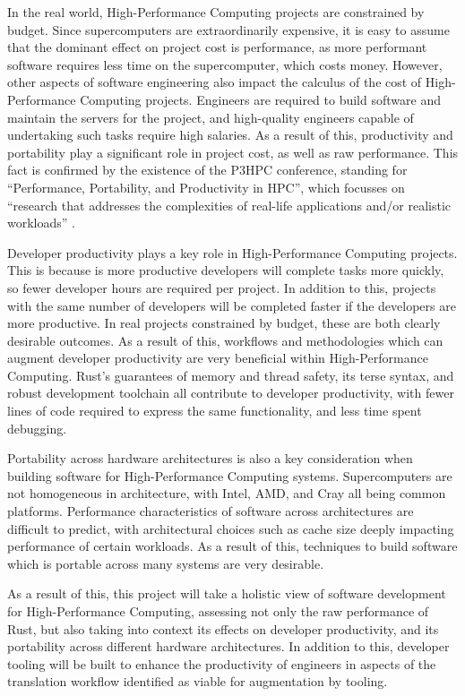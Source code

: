 In the real world, High-Performance Computing projects are constrained by budget. Since supercomputers are extraordinarily expensive, it is easy to assume that the dominant effect on project cost is performance, as more performant software requires less time on the supercomputer, which costs money. However, other aspects of software engineering also impact the calculus of the cost of High-Performance Computing projects. Engineers are required to build software and maintain the servers for the project, and high-quality engineers capable of undertaking such tasks require high salaries. As a result of this, productivity and portability play a significant role in project cost, as well as raw performance. This fact is confirmed by the existence of the P3HPC conference, standing for ``Performance, Portability, and Productivity in HPC'', which focusses on ``research that addresses the complexities of real-life applications and/or realistic workloads'' \cite{P3HPC}.

Developer productivity plays a key role in High-Performance Computing projects. This is because is more productive developers will complete tasks more quickly, so fewer developer hours are required per project. In addition to this, projects with the same number of developers will be completed faster if the developers are more productive. In real projects constrained by budget, these are both clearly desirable outcomes. As a result of this, workflows and methodologies which can augment developer productivity are very beneficial within High-Performance Computing. Rust's guarantees of memory and thread safety, its terse syntax, and robust development toolchain all contribute to developer productivity, with fewer lines of code required to express the same functionality, and less time spent debugging.

Portability across hardware architectures is also a key consideration when building software for High-Performance Computing systems. Supercomputers are not homogeneous in architecture, with Intel, AMD, and Cray all being common platforms. Performance characteristics of software across architectures are difficult to predict, with architectural choices such as cache size deeply impacting performance of certain workloads. As a result of this, techniques to build software which is portable across many systems are very desirable.

As a result of this, this project will take a holistic view of software development for High-Performance Computing, assessing not only the raw performance of Rust, but also taking into context its effects on developer productivity, and its portability across different hardware architectures. In addition to this, developer tooling will be built to enhance the productivity of engineers in aspects of the translation workflow identified as viable for augmentation by tooling.


